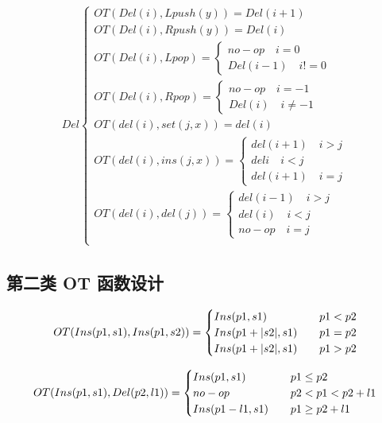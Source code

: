 \documentclass[a4paper,UTF8]{article}
\begin{document}
\begin{equation}
\begin{aligned}
Del \begin{cases}
OT(Del (i),Lpush(y))=
{Del(i+1)} \\
OT(Del (i),Rpush(y))=
{Del (i)}\\
OT(Del (i),Lpop)=\begin{cases}
{no-op} \quad i=0\\
{Del(i-1)} \quad i!=0 \end{cases}\\
OT(Del (i),Rpop)=\begin{cases}
{no-op} \quad i=-1\\
{Del(i)} \quad i \neq -1 \end{cases}\\
OT(del (i), set (j,x)) =
	{del(i)}\\
OT(del (i), ins (j,x)) =\begin{cases}
	{del (i+1)}  \quad i > j\\
	{del i}   \quad i < j\\
	{del (i+1)}  \quad i = j \end{cases}\\
OT(del (i), del (j)) =\begin{cases}
	{del (i-1)} \quad i > j\\
	{del (i)} \quad i < j\\
	{no-op}   \quad i = j \end{cases}\\
\end{cases}
\end{aligned}
\end{equation}

\subsection{第二类 OT 函数设计}
\begin{equation}
OT(Ins(p1,s1),Ins(p1,s2))= \begin{cases}
Ins(p1,s1) \quad & p1<p2 \\
Ins(p1+ |s2|,s1) \quad & p1=p2\\
Ins(p1+ |s2|,s1) \quad & p1>p2 \end{cases}\\
\end{equation}

\begin{equation}
OT(Ins(p1,s1),Del(p2,l1))= \begin{cases}
Ins(p1,s1) \quad & p1 \le p2 \\
no-op \quad & p2<p1<p2+l1\\
Ins(p1-l1,s1) \quad & p1 \ge p2+l1 \end{cases}\\
\end{equation}
\end{document}
